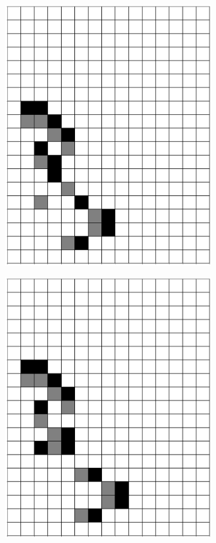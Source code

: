 \documentclass[12pt]{article}
\numberwithin{figure}{section} %
\begin{document}
\begin{figure}[H]
\begin{subfigure}{0.3\textwidth}
     		\includegraphics[width=\linewidth]{Section4/29.2}
     		\subcaption{}
   	\end{subfigure}
   	\begin{subfigure}{0.3\textwidth}
     		\centering
     		\includegraphics[width=\linewidth]{Section4/29.3}

\end{subfigure}
\end{figure}
\end{document}
